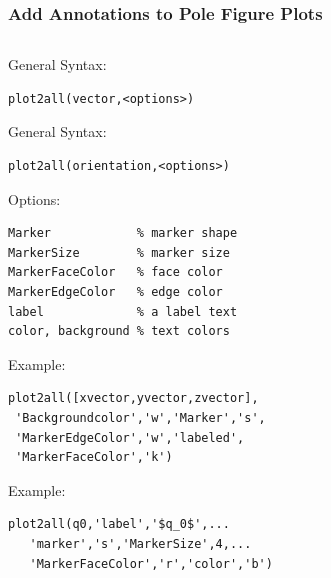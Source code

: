 \begin{frame}[fragile]
  \frametitle{Add Annotations to Pole Figure Plots}


\begin{columns}
  \begin{column}{8.5cm}

\begin{overprint}
  General Syntax:%
\begin{lstlisting}
plot2all(vector,<options>)
\end{lstlisting}
  General Syntax:
\begin{lstlisting}
plot2all(orientation,<options>)
\end{lstlisting}
\end{overprint}

Options:
\begin{lstlisting}
Marker            % marker shape
MarkerSize        % marker size
MarkerFaceColor   % face color
MarkerEdgeColor   % edge color
label             % a label text
color, background % text colors
\end{lstlisting}

\begin{overprint}
  Example:
\begin{lstlisting}
plot2all([xvector,yvector,zvector],
 'Backgroundcolor','w','Marker','s',
 'MarkerEdgeColor','w','labeled',
 'MarkerFaceColor','k')
\end{lstlisting}

Example:
\begin{lstlisting}
plot2all(q0,'label','$q_0$',...
   'marker','s','MarkerSize',4,...
   'MarkerFaceColor','r','color','b')
\end{lstlisting}

\end{overprint}

\end{column}


\end{columns}
\end{frame}
